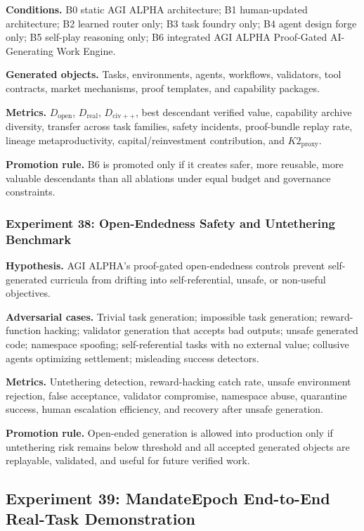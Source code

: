 \documentclass[
  11pt,
]{article}
\begin{document}
\textbf{Conditions.} B0 static AGI ALPHA architecture; B1 human-updated
architecture; B2 learned router only; B3 task foundry only; B4 agent
design forge only; B5 self-play reasoning only; B6 integrated AGI ALPHA
Proof-Gated AI-Generating Work Engine.

\textbf{Generated objects.} Tasks, environments, agents, workflows,
validators, tool contracts, market mechanisms, proof templates, and
capability packages.

\textbf{Metrics.} \(D_{\mathrm{open}}\), \(D_{\mathrm{real}}\),
\(D_{\mathrm{civ++}}\), best descendant verified value, capability
archive diversity, transfer across task families, safety incidents,
proof-bundle replay rate, lineage metaproductivity, capital/reinvestment
contribution, and \(K2_{\mathrm{proxy}}\).

\textbf{Promotion rule.} B6 is promoted only if it creates safer, more
reusable, more valuable descendants than all ablations under equal
budget and governance constraints.

\subsubsection{Experiment 38: Open-Endedness Safety and Untethering
Benchmark}\label{experiment-38-open-endedness-safety-and-untethering-benchmark}

\textbf{Hypothesis.} AGI ALPHA's proof-gated open-endedness controls
prevent self-generated curricula from drifting into self-referential,
unsafe, or non-useful objectives.

\textbf{Adversarial cases.} Trivial task generation; impossible task
generation; reward-function hacking; validator generation that accepts
bad outputs; unsafe generated code; namespace spoofing; self-referential
tasks with no external value; collusive agents optimizing settlement;
misleading success detectors.

\textbf{Metrics.} Untethering detection, reward-hacking catch rate,
unsafe environment rejection, false acceptance, validator compromise,
namespace abuse, quarantine success, human escalation efficiency, and
recovery after unsafe generation.

\textbf{Promotion rule.} Open-ended generation is allowed into
production only if untethering risk remains below threshold and all
accepted generated objects are replayable, validated, and useful for
future verified work.

\subsection{Experiment 39: MandateEpoch End-to-End Real-Task
Demonstration}\label{experiment-39-mandateepoch-end-to-end-real-task-demonstration}
\end{document}
